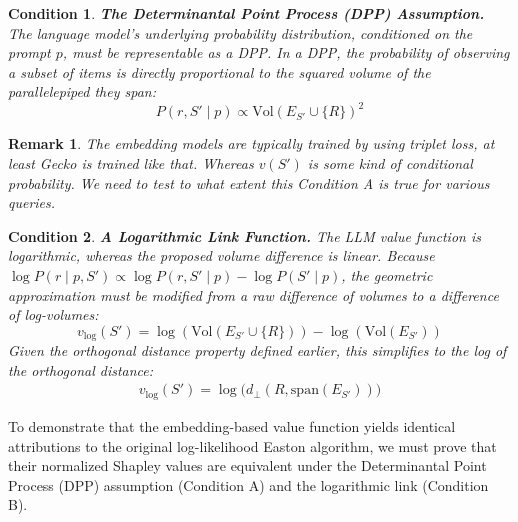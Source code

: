 \documentclass{article}
\newtheorem{remark}[theorem]{Remark}
\newtheorem{condition}{Condition}
\begin{document}


\begin{condition}
\textbf{The Determinantal Point Process (DPP) Assumption.} 
The language model's underlying probability distribution, conditioned on the prompt $p$, must be representable as a DPP. In a DPP, the probability of observing a subset of items is directly proportional to the squared volume of the parallelepiped they span:
$$ P(r, S' \mid p) \propto \text{Vol}(E_{S'} \cup \{R\})^2 $$
\end{condition}

\begin{remark}
The embedding models are typically trained by using triplet loss, at least Gecko is trained like that. Whereas $v(S')$ is some kind of conditional probability. We need to test to what extent this Condition A is true for various queries.
\end{remark}

\begin{condition}
\textbf{A Logarithmic Link Function.} 
The LLM value function is logarithmic, whereas the proposed volume difference is linear. Because $\log P(r \mid p, S') \propto \log P(r, S' \mid p) - \log P(S' \mid p)$, the geometric approximation must be modified from a raw difference of volumes to a difference of log-volumes:
$$ v_{\log}(S') = \log(\text{Vol}(E_{S'} \cup \{R\})) - \log(\text{Vol}(E_{S'})) $$
Given the orthogonal distance property defined earlier, this simplifies to the log of the orthogonal distance:
\begin{align} \label{eq:v_log}
     v_{\log}(S') = \log\big(d_{\perp}(R, \text{span}(E_{S'}))\big)
\end{align}     
\end{condition}

To demonstrate that the embedding-based value function yields identical attributions to the original log-likelihood Easton algorithm, we must prove that their normalized Shapley values are equivalent under the Determinantal Point Process (DPP) assumption (Condition A) and the logarithmic link (Condition B).
\end{document}
